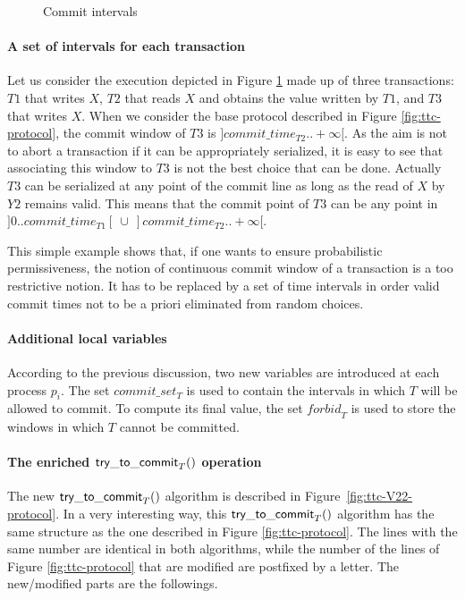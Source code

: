 \begin{figure}[ht!]
\centering
\scalebox{0.35}{}
\caption{Commit intervals}
\label{fig:intervals}
\end{figure}
    


\paragraph{A set of intervals for each transaction}
Let us consider the execution depicted in Figure \ref{fig:intervals}
made up of three transactions: $T1$ that writes $X$, $T2$ that reads $X$ 
and obtains the value written by $T1$, and  $T3$ that writes $X$. 
When we consider the base protocol described in Figure 
\ref{fig:ttc-protocol}, the commit window of $T3$ is 
$]commit\_time_{T2}..+\infty[$. 
As the aim is  not to abort a transaction if it can be appropriately 
serialized, it is easy to see  that associating  this window to $T3$ is not
the best  choice that can be done.  Actually $T3$ can be  serialized at any
point of the commit line as long as the  read of $X$ by $Y
2$ remains
valid. This  means that the  commit point of  $T3$ can be 
any point in $]0..commit\_time_{T1}[ ~\cup~]commit\_time_{T2}..+\infty[$.

This simple example shows that,  if one wants to ensure probabilistic 
permissiveness,   the notion of  continuous commit  window  of a transaction
is a too restrictive notion.  It has  to be replaced  by  a set  of time
intervals  in order valid commit times not to be a priori eliminated from 
random choices.  



\paragraph{Additional  local variables}
According to the  previous discussion, two new variables  are introduced at
each process $p_i$.  
The set   $\mathit{commit\_set}_T$ is  used to contain  the  intervals
in which  $T$ will be allowed to  commit. To  compute  its   final  value,  
the  set $\mathit{forbid}_T$ is used to store  the windows in which $T$ 
cannot be committed.  


\paragraph{The enriched ${\sf try\_to\_commit}_T()$ operation}
The new  ${\sf try\_to\_commit}_T()$ algorithm
is described in Figure~\ref{fig:ttc-V22-protocol}.
In a very interesting way, this  ${\sf try\_to\_commit}_T()$ 
algorithm has the same structure as the one described in  
Figure \ref{fig:ttc-protocol}. The lines with the same number are 
identical in both algorithms, while the number of the lines of 
Figure \ref{fig:ttc-protocol} that are modified are postfixed by a letter. 
The new/modified  parts are the followings. 



